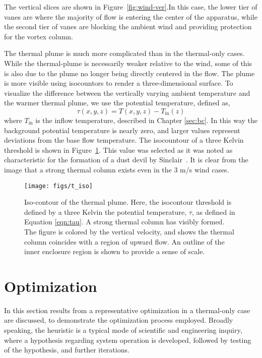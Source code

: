 The vertical slices are shown in Figure~\ref{fig:wind-ver}.In this 
case, the lower tier of vanes are where the majority of flow is 
entering the center of the apparatus, while the second tier of vanes are
blocking the ambient wind and providing protection for the vortex column. 

The thermal plume is much more complicated than in the thermal-only
cases. While the thermal-plume is necessarily weaker relative to the
wind, some of this is also due to the plume no longer being directly
centered in the flow. The plume is more visible using isocountors to
render a three-dimensional surface. 
To visualize the difference between the vertically varying ambient
temperature and the warmer thermal plume, we use the potential
temperature, defined as, 
\begin{equation}
  \tau(x,y,z) = T(x,y,z) -T_{\text{in}}(z) 
   \label{eqn:tau}
\end{equation}
where $T_{\text{in}}$ is the inflow temperature, described
in Chapter \ref{sec:bc}. In this way the background potential
temperature is nearly zero, and larger values represent deviations from
the base flow temperature. The isocountour of a three Kelvin threshold
is  shown in Figure~\ref{fig:field_real}. This value was selected as
it was noted as characteristic for the formation of a dust devil by
Sinclair~\cite{Sinclair1969}. It is clear from the image that a 
strong thermal column exists even in the 3 m/s wind cases. 

%
%
  \begin{figure}[!htb]
   \begin{center}
    \texttt{[image: figs/t\_iso]}
    \caption{Iso-contour of the thermal plume. Here, the isocontour
    threshold is defined by a three Kelvin the potential temperature,
    $\tau$, as defined in Equation \ref{eqn:tau}. A strong thermal
    column has visibly formed. The figure is colored by the vertical
    velocity, and shows the thermal column coincides with a region of
    upward flow. An outline of the inner enclosure region is shown to
    provide a sense of scale.} 
    \label{fig:field_real}
   \end{center}
  \end{figure}

\section{Optimization}
\label{sec:opt}

In this section results from a representative optimization
in a thermal-only case are discussed, to demonstrate the optimization  
process employed. Broadly speaking, the heuristic is a typical mode of
scientific and engineering inquiry, where a hypothesis regarding system
operation is developed, followed by testing of the hypothesis, and further
iterations.  

